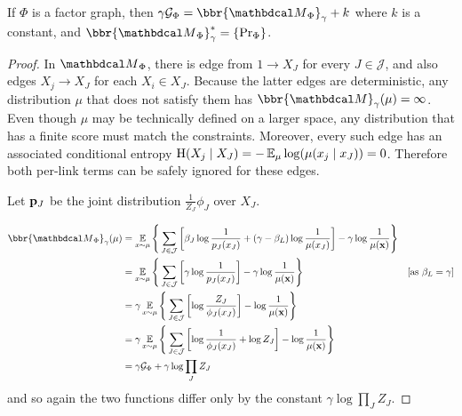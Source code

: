 If $\Phi$ is a factor graph, then
$\gamma \mathcal G_\Phi = \bbr{\PDGof{\Phi}}_{\gamma} + k$        
	where $k$ is a constant, and 
	$\bbr{\PDGof{\Phi}}_{\gamma}^* = \{\Pr_{\Phi} \}$. 
\eothm

\begin{proof}
	In $\PDGof{\Phi}$, there is edge from $1 \to X_J$ for every $J \in \mathcal J$, and also edges $X_j \to X_J$ for each $X_i \in X_J$. Because the latter edges are deterministic, any distribution $\mu$ that does not satisfy them has $\bbr{\dg M}_\gamma(\mu) = \infty$. Even though $\mu$ may be technically defined on a larger space, any distribution that has a finite score must match the constraints. Moreover, every such edge has an associated conditional entropy $\operatorname{\mathrm{H}}(X_j \mid X_J) = -\operatorname*{\mathbb{E}}_\mu\log(\mu(x_j \mid x_J)) = 0$. Therefore both per-link terms can be safely ignored for these edges.

	Let $\mathbf{p}_J$ be the joint distribution $\frac{1}{Z_J}\phi_J$ over $X_J$.

	\begin{align*}
	\bbr{\PDGof{\Phi}}_\gamma(\mu) &= \E_{ x \sim \mu} \Bigg\{   \sum_{ J \in \mathcal J } \left[
		\beta_J \log \frac{1}{ p_J(x_J) } + (\gamma - \beta_L ) \log \frac{1}{\mu(x_J)} \right] - \gamma \log \frac{1}{\mu(\mat x)} \Bigg\} \\
		&= \E_{ x \sim \mu} \Bigg\{  \sum_{ J \in \mathcal J }\left[
			\gamma \log \frac{1}{p_J(x_J)}  \right] - \gamma \log \frac{1}{\mu(\mat x)} \Bigg\} 
					&\text{[as $\beta_L = \gamma$]}\\
		&= \gamma \E_{x \sim \mu} \Bigg\{  \sum_{ J \in \mathcal J } \left[
			\log \frac{Z_J}{\phi_J(x_J)}  \right] -\log \frac{1}{\mu(\mat x)} \Bigg\} \\
		&= \gamma \E_{x \sim \mu} \Bigg\{  \sum_{ J \in \mathcal J } \left[
			\log \frac{1}{\phi_J(x_J)} + \log Z_J \right]  - \log \frac{1}{\mu(\mat x)} \Bigg\} \\
		&= \gamma \mathcal G_{\Phi} + \gamma \log \prod_{J} Z_J
	\end{align*}
	and so again the two functions differ only by the constant $\gamma \log \prod_{J} Z_J$.
\end{proof}
